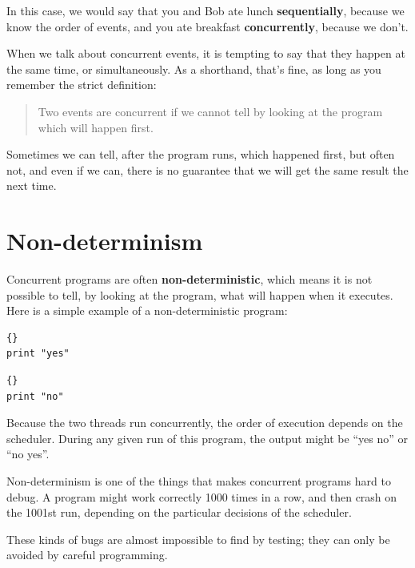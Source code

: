 \documentclass{book}
\begin{document}
In this case, we would say that you and Bob ate lunch
    {\bf sequentially}, because we know the order of events, and you
ate breakfast {\bf concurrently}, because we don't.

When we talk about concurrent events, it is tempting to say
that they happen at the same time, or simultaneously.  As a
shorthand, that's fine, as long as you remember the strict
definition:

\begin{quote}
    Two events are concurrent if we cannot tell by looking at
    the program which will happen first.
\end{quote}

Sometimes we can tell, after the program runs, which happened first,
but often not, and even if we can, there is no guarantee that we will
get the same result the next time.


\newpage
\section {Non-determinism}

Concurrent programs are often {\bf non-deterministic}, which means it
is not possible to tell, by looking at the program, what will happen
when it executes.  Here is a simple example of a
non-deterministic program:

\begin{minipage}[t]{0.4\textwidth}
    \begin{lstlisting}[title={Thread A}]{}
print "yes"
\end{lstlisting}
\end{minipage}
\hfill
\begin{minipage}[t]{0.4\textwidth}
    \begin{lstlisting}[title={Thread B}]{}
print "no"
\end{lstlisting}
\end{minipage}

Because the two threads run concurrently, the order of
execution depends on the scheduler.  During any given run
of this program, the output might be ``yes no'' or ``no yes''.

Non-determinism is one of the things that makes concurrent
programs hard to debug.  A program might work correctly
1000 times in a row, and then crash on the 1001st run, depending
on the particular decisions of the scheduler.

These kinds of bugs are almost impossible to find by testing;
they can only be avoided by careful programming.
\end{document}
